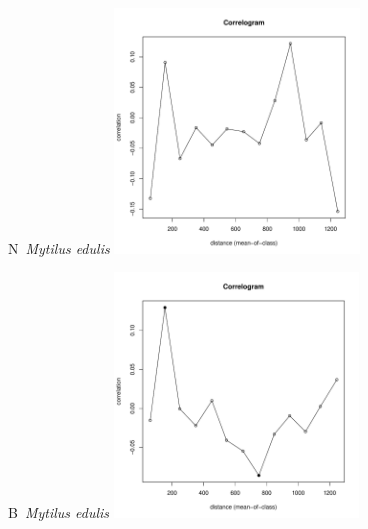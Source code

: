 \documentclass[12pt, a4paper]{disser}
\begin{document}
	\begin{figure}[h]

	\begin{minipage}[b]{.46\linewidth}
	\begin{center}
	{\small N~{\it Mytilus edulis}}
		\includegraphics[width=65mm]{../Barenc_Sea/distribution_Moran/Plyazh0812_moran_N_Mytilus_edulis_.pdf}
	\end{center}
	\end{minipage}
%
	\hfil %
%
	\begin{minipage}[b]{.46\linewidth}
	\begin{center}
	{\small B~{\it Mytilus edulis}}
		\includegraphics[width=65mm]{../Barenc_Sea/distribution_Moran/Plyazh0812_moran_B_Mytilus_edulis_.pdf}
	\end{center}
	\end{minipage}


\end{figure}
\end{document}
